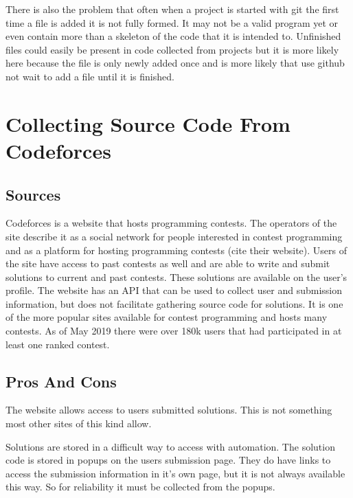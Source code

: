 \documentclass{article}
\begin{document}
There is also the problem that often when a project is started with git the first time a file is added it is not fully formed. It may not be a valid program yet or even contain more than a skeleton of the code that it is intended to. Unfinished files could easily be present in code collected from projects but it is more likely here because the file is only newly added once and is more likely that use github not wait to add a file until it is finished.

\section{Collecting Source Code From Codeforces}


\subsection{Sources}
Codeforces is a website that hosts programming contests. The operators of the site describe it as a social network for people interested in contest programming and as a platform for hosting programming contests (cite their website). Users of the site have access to past contests as well and are able to write and submit solutions to current and past contests. These solutions are available on the user's profile. The website has an API that can be used to collect user and submission information, but does not facilitate gathering source code for solutions. It is one of the more popular sites available for contest programming and hosts many contests. As of May 2019 there were over 180k users that had participated in at least one ranked contest.

\subsection{Pros And Cons}
The website allows access to users submitted solutions. This is not something most other sites of this kind allow. 

Solutions are stored in a difficult way to access with automation. The solution code is stored in popups on the users submission page. They do have links to access the submission information in it's own page, but it is not always available this way. So for reliability it must be collected from the popups.
\end{document}
